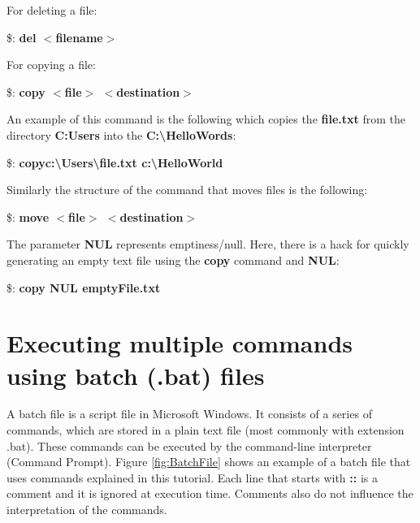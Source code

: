 \documentclass{article}
\begin{document}
	\par For deleting a file:
	
	\$: \textbf{del $<$filename$>$}
	
	\par For copying a file:
	
	\par \$: \textbf{copy $<$file$>$ $<$destination$>$}
	
	\par An example of this command is the following which copies the \textbf{file.txt} from the directory \textbf{C:Users} into the \textbf{C:\textbackslash HelloWords}:
	
	\par \$: 	\textbf{copy\space\space c:\textbackslash Users\textbackslash file.txt \space c:\textbackslash HelloWorld 
	 }
	 
    \par Similarly the structure of the command that moves files is the following:
    
    
    \par \$: \textbf{move $<$file$>$ $<$destination$>$}
    
    \par The parameter \textbf{NUL} represents emptiness/null. Here, there is a hack for quickly generating an empty text file using the \textbf{copy} command and \textbf{NUL}: 
    \par \$: \textbf{copy NUL emptyFile.txt }
    
  
	
	\newpage
	\section{Executing multiple commands using batch (.bat) files}
	\par A batch file is a script file in Microsoft Windows. It consists of a series of commands, which are stored in a plain text file (most commonly with extension .bat). These commands can be executed by the command-line interpreter (Command Prompt). Figure \ref{fig:BatchFile} shows an example of a batch file that uses commands explained in this tutorial. Each line that starts with \textbf{::} is a comment and it is ignored at execution time. Comments also do not influence the interpretation of the commands. 
	
\end{document}
